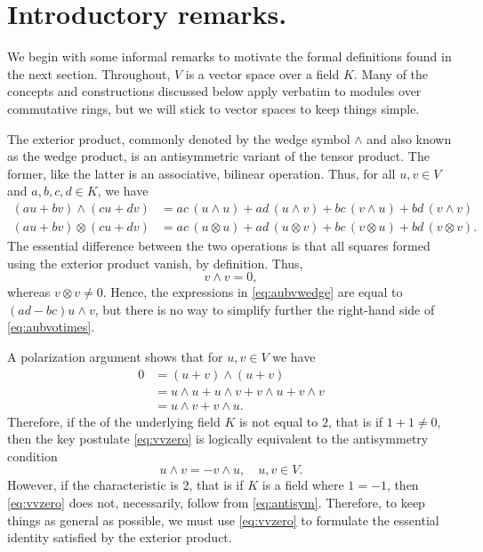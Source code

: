 \documentclass[12pt]{article}
\begin{document}

\section{Introductory remarks.}
We begin with some informal remarks to motivate the formal definitions
found in the next section. Throughout, $V$ is a vector space over a
field $K$.  Many of the concepts and constructions discussed below
apply verbatim to modules over commutative rings, but we will stick to
vector spaces to keep things simple.

The exterior product, commonly denoted by the wedge symbol $\wedge$
and also known as the wedge product, is an antisymmetric variant of
the tensor product.  The former, like the latter is an associative,
bilinear operation. Thus, for all $u,v\in V$ and $a,b,c,d\in K$,
we have
\begin{align}
  \label{eq:aubvwedge}
  (au+bv) \wedge (cu + dv ) &= ac\, (u\wedge u) + ad\, (u\wedge v) + bc\,   (v\wedge u)
  + bd\, (v\wedge v)\\
  \label{eq:aubvotimes}
  (au+bv) \otimes (cu + dv ) &= ac\, (u\otimes u) + ad\, (u\otimes v) + bc\,
  (v\otimes u)   + bd\, (v\otimes v).
\end{align}
The essential difference between the two operations is that all
squares formed using the exterior product vanish, by definition.
Thus,
\begin{equation}
  \label{eq:vvzero}
  v\wedge v =0,  
\end{equation}
whereas $v\otimes v\neq 0$. Hence, the expressions in
\eqref{eq:aubvwedge} are equal to $(ad-bc) u\wedge v$, but there is no
way to simplify further the right-hand side of \eqref{eq:aubvotimes}.

A polarization argument shows
that for $u,v\in V$ we have
\begin{align*}
  0 &= (u+v)\wedge (u+v) \\& = u\wedge u + u\wedge v + v\wedge u +
  v\wedge
  v\\
  &= u\wedge v + v\wedge u.
\end{align*}
Therefore, if the  of the underlying field $K$ is not equal to $2$, that is if $1+1\neq 0$, then the key postulate \eqref{eq:vvzero} is
logically equivalent to the antisymmetry condition
\begin{equation}
  \label{eq:antisym}
  u\wedge v = -v\wedge u,\quad u,v\in V.
\end{equation}
However, if the characteristic is 2, that is if $K$ is a field where
$1=-1$, then \eqref{eq:vvzero} does not, necessarily, follow from
\eqref{eq:antisym}.  Therefore, to keep things as general as possible,
we must use \eqref{eq:vvzero} to formulate the essential identity
satisfied by the exterior product.
\end{document}
